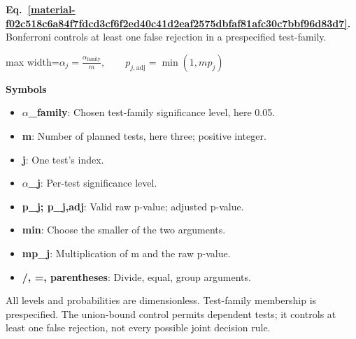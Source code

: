 \documentclass[11pt,a4paper]{article}
\begin{document}
\par\medskip
\noindent\begin{minipage}{\linewidth}
\label{material-f02c518c6a84f7fdcd3cf6f2ed40c41d2eaf2575dbfaf81afc30c7bbf96d83d7}
\noindent\textbf{Eq.~\ref*{material-f02c518c6a84f7fdcd3cf6f2ed40c41d2eaf2575dbfaf81afc30c7bbf96d83d7}.} Bonferroni controls at least one false rejection in a prespecified test-family.\par\nopagebreak
\begin{center}\begin{adjustbox}{max width=\linewidth}$\displaystyle \alpha_j=\frac{\alpha_{\mathrm{family}}}{m},\qquad p_{j,\mathrm{adj}}=\min(1,mp_j)$\end{adjustbox}\end{center}

\par\noindent\textbf{Symbols}

\begin{itemize}\setlength{\itemsep}{1pt}\setlength{\parsep}{0pt}
\item \textbf{\ensuremath{\alpha}\_family}: Chosen test-family significance level, here 0.05.
\item \textbf{m}: Number of planned tests, here three; positive integer.
\item \textbf{j}: One test's index.
\item \textbf{\ensuremath{\alpha}\_j}: Per-test significance level.
\item \textbf{p\_j; p\_j,adj}: Valid raw p-value; adjusted p-value.
\item \textbf{min}: Choose the smaller of the two arguments.
\item \textbf{mp\_j}: Multiplication of m and the raw p-value.
\item \textbf{/, =, parentheses}: Divide, equal, group arguments.
\end{itemize}

All levels and probabilities are dimensionless. Test-family membership is prespecified. The union-bound control permits dependent tests; it controls at least one false rejection, not every possible joint decision rule.

\end{minipage}\par
\medskip
\end{document}
